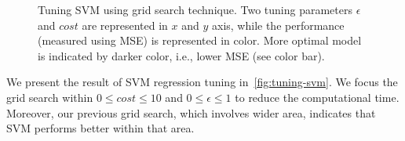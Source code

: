 	\begin{figure}[H]
		\begin{adjustwidth}{-3.5cm}{}
		\centering
		\end{adjustwidth}
		\caption[Tuning \ac{SVM}.]
		{Tuning \ac{SVM} using grid search technique. Two tuning parameters $\epsilon$ and $cost$ are represented in $x$ and $y$ axis, while the performance (measured using \ac{MSE}) is represented in color. More optimal model is indicated by darker color, i.e., lower \ac{MSE} (see color bar).}
		\label{fig:tuning-svm}
	\end{figure}

	We present the result of \ac{SVM} regression tuning in~\autoref{fig:tuning-svm}.
	We focus the grid search within $0 \le cost \le 10$ and $0 \le \epsilon \le 1$ to reduce the computational time. Moreover, our previous grid search, which involves wider area, indicates that \ac{SVM} performs better within that area.

